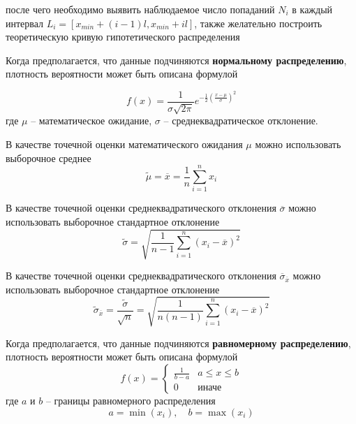 \documentclass[12pt,a4paper]{article}
\begin{document}
после чего необходимо выявить наблюдаемое число попаданий $N_i$ в каждый интервал 
$L_i = [x_{min} + (i-1)l, x_{min} + il]$, также желательно построить теоретическую кривую
гипотетического распределения

Когда предполагается, что данные подчиняются \textbf{нормальному распределению}, плотность 
вероятности может быть описана формулой

\begin{equation}
f(x) = \frac{1}{\sigma \sqrt{2\pi}} e^{-\frac{1}{2}\left(\frac{x - \mu}{\sigma}\right)^2}
\tag{1.2}
\label{normal_distribution}
\end{equation}
где $\mu$ – математическое ожидание, $\sigma$ – среднеквадратическое отклонение.

В качестве точечной оценки математического ожидания $\mu$ можно использовать выборочное среднее
\begin{equation}
\tilde{\mu} = \overline{x} = \frac{1}{n} \sum_{i=1}^{n} x_i
\tag{1.3}
\label{normal_distribution:mean}
\end{equation}

В качестве точечной оценки среднеквадратического отклонения $\overline{\sigma}$ можно 
использовать выборочное стандартное отклонение
\begin{equation}
\tilde{\sigma} = \sqrt{\frac{1}{n-1} \sum_{i=1}^{n} (x_i - \overline{x})^2}
\tag{1.4}
\label{normal_distribution:stddev}
\end{equation}

В качестве точечной оценки среднеквадратического отклонения $\overline{\sigma}_{\overline{x}}$ можно 
использовать выборочное стандартное отклонение
\begin{equation}
\tilde{\sigma}_{\overline{x}} = \frac{\tilde\sigma}{\sqrt{n}} = \sqrt{\frac{1}{n(n-1)} \sum_{i=1}^{n} (x_i - \overline{x})^2}
\tag{1.5}
\label{normal_distribution:stddev:mean}
\end{equation}

Когда предполагается, что данные подчиняются \textbf{равномерному распределению}, плотность 
вероятности может быть описана формулой
\begin{equation*}
f(x) = \begin{cases}
\displaystyle\frac{1}{b - a} & a \leq x \leq b \\
0 & \text{иначе}
\end{cases}
\end{equation*}
где $a$ и $b$ – границы равномерного распределения
\begin{equation*}
a = \min(x_i), \quad b = \max(x_i)
\end{equation*} 
\end{document}
